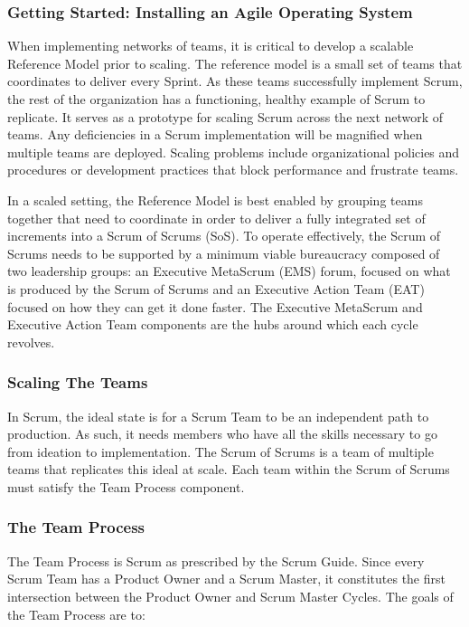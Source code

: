 \documentclass[12pt,a4paper,parskip=full]{scrartcl}
\begin{document}
\subsubsection{Getting Started: Installing an Agile Operating
System}\label{getting-started-installing-an-agile-operating-system}

When implementing networks of teams, it is critical to develop a
scalable Reference Model prior to scaling. The reference model is a
small set of teams that coordinates to deliver every Sprint. As these
teams successfully implement Scrum, the rest of the organization has a
functioning, healthy example of Scrum to replicate. It serves as a
prototype for scaling Scrum across the next network of teams. Any
deficiencies in a Scrum implementation will be magnified when multiple
teams are deployed. Scaling problems include organizational policies and
procedures or development practices that block performance and frustrate
teams.

In a scaled setting, the Reference Model is best enabled by grouping
teams together that need to coordinate in order to deliver a fully
integrated set of increments into a Scrum of Scrums (SoS). To operate
effectively, the Scrum of Scrums needs to be supported by a minimum
viable bureaucracy composed of two leadership groups: an Executive
MetaScrum (EMS) forum, focused on what is produced by the Scrum of
Scrums and an Executive Action Team (EAT) focused on how they can get it
done faster. The Executive MetaScrum and Executive Action Team
components are the hubs around which each cycle revolves.

\subsubsection{Scaling The Teams}\label{scaling-the-teams}

In Scrum, the ideal state is for a Scrum Team to be an independent path
to production. As such, it needs members who have all the skills
necessary to go from ideation to implementation. The Scrum of Scrums is
a team of multiple teams that replicates this ideal at scale. Each team
within the Scrum of Scrums must satisfy the Team Process component.

\subsubsection{The Team Process}\label{the-team-process}

The Team Process is Scrum as prescribed by the Scrum Guide. Since every
Scrum Team has a Product Owner and a Scrum Master, it constitutes the
first intersection between the Product Owner and Scrum Master Cycles.
The goals of the Team Process are to:
\end{document}
